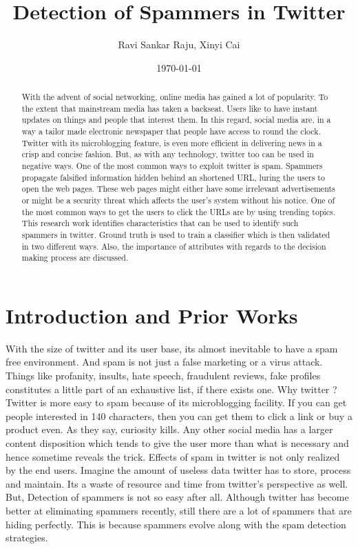 \documentclass[11pt]{article}
\begin{document}
\title{Detection of Spammers in Twitter}

\author{Ravi Sankar Raju, Xinyi Cai}


\date{\today}

\maketitle

\begin{abstract}
With the advent of social networking, online media has gained a lot of popularity. To the extent that mainstream media has taken a backseat. Users like to have instant updates on things and people that interest them. In this regard, social media are, in a way a tailor made electronic newspaper that people have access to round the clock. Twitter with its microblogging feature, is even more efficient in delivering news in a crisp and concise fashion. But, as with any technology, twitter too can be used in negative ways. One of the most common ways to exploit twitter is spam. Spammers propagate falsified information hidden behind an shortened URL, luring the users to open the web pages. These web pages might either have some irrelevant advertisements or might be a security threat which affects the user's system without his notice. One of the most common ways to get the users to click the URLs are by using trending topics. This research work identifies characteristics that can be used to identify such spammers in twitter. Ground truth is used to train a classifier which is then validated in two different ways. Also, the importance of attributes with regards to the decision making process are discussed.
\end{abstract}

\section{Introduction and Prior Works}

With the size of twitter and its user base, its almost inevitable to have a spam free environment. And spam is not just a false marketing or a virus attack. Things like profanity, insults, hate speech, fraudulent reviews, fake profiles constitutes a little part of an exhaustive list, if there exists one. Why twitter ? Twitter is more easy to spam because of its microblogging facility. If you can get people interested in 140 characters, then you can get them to click a link or buy a product even. As they say, curiosity kills. Any other social media has a larger content disposition which tends to give the user more than what is necessary and hence sometime reveals the trick.
Effects of spam in twitter is not only realized by the end users. Imagine the amount of useless data twitter has to store, process and maintain. Its a waste of resource and time from twitter's perspective as well. But, Detection of spammers is not so easy after all. Although twitter has become better at eliminating spammers recently, still there are a lot of spammers that are hiding perfectly. This is because spammers evolve along with the spam detection strategies.
\end{document}
